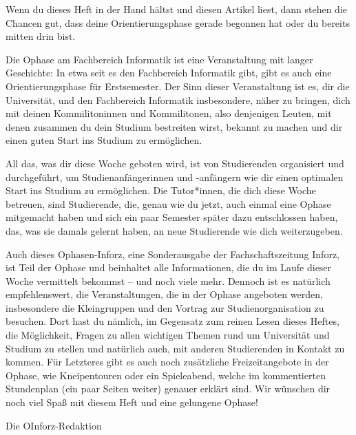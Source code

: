 {Wenn du dieses Heft in der Hand hältst und diesen Artikel liest, dann stehen die Chancen gut, dass deine Orientierungsphase gerade begonnen hat oder du bereits mitten drin bist.}
{
    Die Ophase am Fachbereich Informatik ist eine Veranstaltung mit langer Geschichte: In etwa seit es den Fachbereich Informatik gibt, gibt es auch eine Orientierungsphase für Erstsemester. Der Sinn dieser Veranstaltung ist es, dir die Universität, und den Fachbereich Informatik insbesondere, näher zu bringen, dich mit deinen Kommilitoninnen und Kommilitonen, also denjenigen Leuten, mit denen zusammen du dein Studium bestreiten wirst, bekannt zu machen und dir einen guten Start ins Studium zu ermöglichen.

    All das, was dir diese Woche geboten wird, ist von Studierenden organisiert und durchgeführt, um Studienanfängerinnen und -anfängern wie dir einen optimalen Start ins Studium zu ermöglichen. Die Tutor*innen, die dich diese Woche betreuen, sind Studierende, die, genau wie du jetzt, auch einmal eine Ophase mitgemacht haben und sich ein paar Semester später dazu entschlossen haben, das, was sie damals gelernt haben, an neue Studierende wie dich weiterzugeben.

    Auch dieses Ophasen-Inforz, eine Sonderausgabe der Fachschaftszeitung Inforz, ist Teil der Ophase und beinhaltet alle Informationen, die du im Laufe dieser Woche vermittelt bekommst – und noch viele mehr. Dennoch ist es natürlich empfehlenswert, die Veranstaltungen, die in der Ophase angeboten werden, insbesondere die Kleingruppen und den Vortrag zur Studienorganisation zu besuchen. Dort hast du nämlich, im Gegensatz zum reinen Lesen dieses Heftes, die Möglichkeit, Fragen zu allen wichtigen Themen rund um Universität und Studium zu stellen und natürlich auch, mit anderen Studierenden in Kontakt zu kommen. Für Letzteres gibt es auch noch zusätzliche Freizeitangebote in der Ophase, wie Kneipentouren oder ein Spieleabend, welche im kommentierten Stundenplan (ein paar Seiten weiter) genauer erklärt sind.
    Wir wünschen dir noch viel Spaß mit diesem Heft und eine gelungene Ophase!
}
{Die OInforz-Redaktion}

\vspace{37mm}

\newpage
